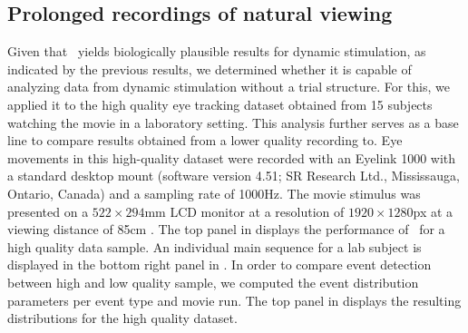 
\subsection*{Prolonged recordings of natural viewing}\label{ana_2}




Given that \remodnav\ yields biologically plausible results for dynamic
stimulation, as indicated by the previous results, we determined whether it is
capable of analyzing data from dynamic stimulation without a trial structure.
For this, we applied it to the high quality eye tracking dataset obtained from
15 subjects watching the movie in a laboratory setting. This analysis further
serves as a base line to compare results obtained from a lower quality
recording to. Eye movements in this high-quality dataset were recorded with an
Eyelink 1000 with a standard desktop mount (software version 4.51; SR Research
Ltd., Mississauga, Ontario, Canada) and a sampling rate of 1000Hz. The movie
stimulus was presented on a $522\times294$mm LCD monitor at a resolution of $1920\times1280$px at a viewing distance of 85cm \citep{Hanke2016}.  The top panel in
 displays the performance of \remodnav\ for a high quality data
sample. An individual main sequence for a lab subject is displayed in the
bottom right panel in . In order to compare event detection
between high and low quality sample, we computed the event distribution
parameters per event type and movie run. The top panel in 
displays the resulting distributions for the high quality dataset.

